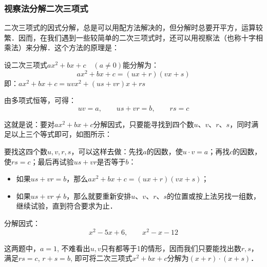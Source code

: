 \subsubsection{视察法分解二次三项式}
二次三项式的因式分解，总是可以用配方法解决的，但分解时总要开平方，运算较繁．因而，在我们遇到一些较简单的二次三项式时，还可以用视察法（也称十字相乘法）来分解．这个方法的原理是：

设二次三项式$ax^2+bx+c\quad (a\ne 0)$能分解为：
\[ax^2+bx+c  =(ux+r)(vx+s)\]
即：$ax^2+bx+c=uv x^2+(us+vr)x+rs$

由多项式恒等，可得：
\[uv=a,\qquad us+vr=b,\qquad rs=c\]

这就是说：要对$ax^2+bx+c$分解因式，只要能寻找到四个数$u$、$v$、$r$、$s$，同时满足以上三个等式即可，如图所示：

\begin{center}
\end{center}


要找这四个数$u,v,r,s$，可以这样去做：先找$a$的因数，使$u\cdot v=a$；再找$c$的因数，使$rs=c$；最后再试验$us+vr$是否等于$b$：
\begin{itemize}
    \item 如果$us+vr=b$，那么$ax^2+bx+c= (ux+r) (vx+s)$；
\item 如果$us+vr\ne b$，那么就要重新安排$u$、$v$、$r$、$s$的位置或按上法另找一组数，继续试验，直到符合要求为止．
\end{itemize}

\begin{example}
分解因式：
\[x^2-5x+6,\qquad x^2-x-12\]   
\end{example}

\begin{analyze}
    这两题中，$a=1$, 不难看出$u,v$只有都等于1的情形，因而我们只要能找出数$r,s$，满足$rs=c$, $r+s=b$, 即可将二次三项式$x^2+bx+c$分解为$(x+r)\cdot (x+s)$．
\end{analyze}

